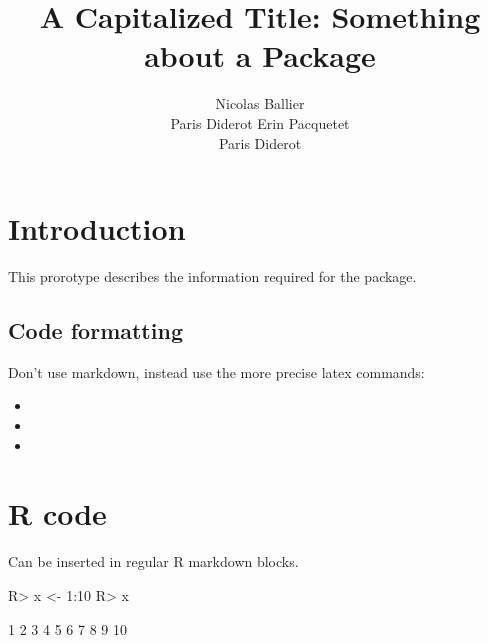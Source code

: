 \documentclass[article]{jss}
\author{
Nicolas Ballier\\Paris Diderot \And Erin Pacquetet\\Paris Diderot
}
\title{A Capitalized Title: Something about a Package \pkg{Rkeylog}}
\providecommand{\tightlist}{%
  \setlength{\itemsep}{0pt}\setlength{\parskip}{0pt}}
\begin{document}
\section{Introduction}\label{introduction}

This prorotype describes the information required for the package.

\subsection{Code formatting}\label{code-formatting}

Don't use markdown, instead use the more precise latex commands:

\begin{itemize}
\tightlist
\item
\item
\item
\end{itemize}

\section{R code}\label{r-code}

Can be inserted in regular R markdown blocks.

\begin{CodeChunk}

\begin{CodeInput}
R> x <- 1:10
R> x
\end{CodeInput}

\begin{CodeOutput}
 [1]  1  2  3  4  5  6  7  8  9 10
\end{CodeOutput}
\end{CodeChunk}
\end{document}
